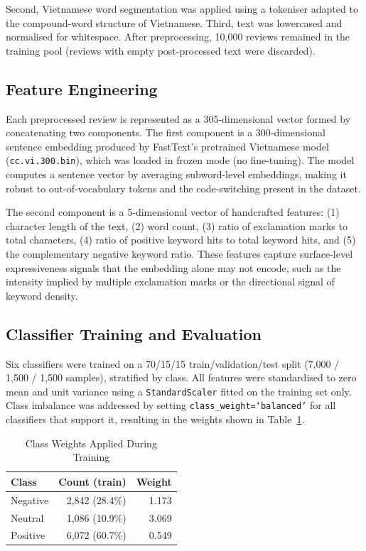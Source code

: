\documentclass[12pt, a4paper]{article}
\begin{document}
Second, Vietnamese word segmentation was applied using a tokeniser adapted to the compound-word structure of Vietnamese. Third, text was lowercased and normalised for whitespace. After preprocessing, 10,000 reviews remained in the training pool (reviews with empty post-processed text were discarded).

\subsection{Feature Engineering}

Each preprocessed review is represented as a 305-dimensional vector formed by concatenating two components. The first component is a 300-dimensional sentence embedding produced by FastText's pretrained Vietnamese model (\texttt{cc.vi.300.bin}), which was loaded in frozen mode (no fine-tuning). The model computes a sentence vector by averaging subword-level embeddings, making it robust to out-of-vocabulary tokens and the code-switching present in the dataset.

The second component is a 5-dimensional vector of handcrafted features: (1) character length of the text, (2) word count, (3) ratio of exclamation marks to total characters, (4) ratio of positive keyword hits to total keyword hits, and (5) the complementary negative keyword ratio. These features capture surface-level expressiveness signals that the embedding alone may not encode, such as the intensity implied by multiple exclamation marks or the directional signal of keyword density.

\subsection{Classifier Training and Evaluation}

Six classifiers were trained on a 70/15/15 train/validation/test split (7,000 / 1,500 / 1,500 samples), stratified by class. All features were standardised to zero mean and unit variance using a \texttt{StandardScaler} fitted on the training set only. Class imbalance was addressed by setting \texttt{class\_weight=`balanced'} for all classifiers that support it, resulting in the weights shown in Table~\ref{tab:class_weights}.

\begin{table}[H]
\centering
\caption{Class Weights Applied During Training}
\label{tab:class_weights}
\begin{tabular}{lrr}
\toprule
\textbf{Class} & \textbf{Count (train)} & \textbf{Weight} \\
\midrule
Negative & 2,842 (28.4\%) & 1.173 \\
Neutral  & 1,086 (10.9\%) & 3.069 \\
Positive & 6,072 (60.7\%) & 0.549 \\
\bottomrule
\end{tabular}
\end{table}
\end{document}
